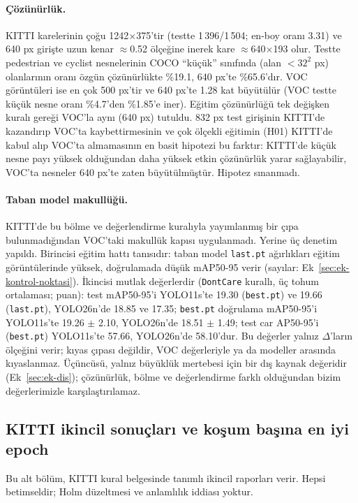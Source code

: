 \paragraph{Çözünürlük.}
KITTI karelerinin çoğu 1242$\times$375'tir (testte 1\,396/1\,504; en-boy oranı 3.31) ve 640 px girişte uzun kenar $\approx$0.52 ölçeğine inerek kare $\approx$640$\times$193 olur. Testte pedestrian ve cyclist nesnelerinin COCO ``küçük'' sınıfında (alan $<32^2$ px) olanlarının oranı özgün çözünürlükte \%19.1, 640 px'te \%65.6'dır. VOC görüntüleri ise en çok 500 px'tir ve 640 px'te 1.28 kat büyütülür (VOC testte küçük nesne oranı \%4.7'den \%1.85'e iner). Eğitim çözünürlüğü tek değişken kuralı gereği VOC'la aynı (640 px) tutuldu. 832 px test girişinin KITTI'de kazandırıp VOC'ta kaybettirmesinin ve çok ölçekli eğitimin (H01) KITTI'de kabul alıp VOC'ta almamasının en basit hipotezi bu farktır: KITTI'de küçük nesne payı yüksek olduğundan daha yüksek etkin çözünürlük yarar sağlayabilir, VOC'ta nesneler 640 px'te zaten büyütülmüştür. Hipotez sınanmadı.

\paragraph{Taban model makullüğü.}
KITTI'de bu bölme ve değerlendirme kuralıyla yayımlanmış bir çıpa bulunmadığından VOC'taki makullük kapısı uygulanmadı. Yerine üç denetim yapıldı. Birincisi eğitim hattı tanısıdır: taban model \texttt{last.pt} ağırlıkları eğitim görüntülerinde yüksek, doğrulamada düşük mAP50-95 verir (sayılar: Ek~\ref{sec:ek-kontrol-noktasi}). İkincisi mutlak değerlerdir (\texttt{DontCare} kurallı, üç tohum ortalaması; puan): test mAP50-95'i YOLO11s'te 19.30 (\texttt{best.pt}) ve 19.66 (\texttt{last.pt}), YOLO26n'de 18.85 ve 17.35; \texttt{best.pt} doğrulama mAP50-95'i YOLO11s'te 19.26 $\pm$ 2.10, YOLO26n'de 18.51 $\pm$ 1.49; test car AP50-95'i (\texttt{best.pt}) YOLO11s'te 57.66, YOLO26n'de 58.10'dur. Bu değerler yalnız $\Delta$'ların ölçeğini verir; kıyas çıpası değildir, VOC değerleriyle ya da modeller arasında kıyaslanmaz. Üçüncüsü, yalnız büyüklük mertebesi için bir dış kaynak değeridir (Ek~\ref{sec:ek-dis}); çözünürlük, bölme ve değerlendirme farklı olduğundan bizim değerlerimizle karşılaştırılamaz.

\subsection{KITTI ikincil sonuçları ve koşum başına en iyi epoch}
Bu alt bölüm, KITTI kural belgesinde tanımlı ikincil raporları verir. Hepsi betimseldir; Holm düzeltmesi ve anlamlılık iddiası yoktur.

